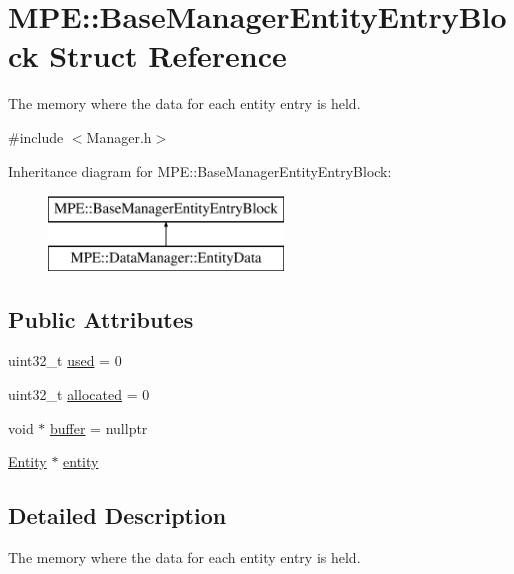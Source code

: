 \hypertarget{struct_m_p_e_1_1_base_manager_entity_entry_block}{}\section{M\+PE\+:\+:Base\+Manager\+Entity\+Entry\+Block Struct Reference}
\label{struct_m_p_e_1_1_base_manager_entity_entry_block}


The memory where the data for each entity entry is held.  




{\ttfamily \#include $<$Manager.\+h$>$}

Inheritance diagram for M\+PE\+:\+:Base\+Manager\+Entity\+Entry\+Block\+:\begin{figure}[H]
\begin{center}
\leavevmode
\includegraphics[height=2.000000cm]{struct_m_p_e_1_1_base_manager_entity_entry_block}
\end{center}
\end{figure}
\subsection*{Public Attributes}
\begin{DoxyCompactItemize}
\item 
uint32\+\_\+t \hyperlink{struct_m_p_e_1_1_base_manager_entity_entry_block_a9bb99ec160ea2058b700023dd7b05d78}{used} = 0
\item 
uint32\+\_\+t \hyperlink{struct_m_p_e_1_1_base_manager_entity_entry_block_a9a3b521d536a0650656c6ffd58868a56}{allocated} = 0
\item 
void $\ast$ \hyperlink{struct_m_p_e_1_1_base_manager_entity_entry_block_a474a83fa9930cbdcd6b4da102ae2b366}{buffer} = nullptr
\item 
\hyperlink{struct_m_p_e_1_1_entity}{Entity} $\ast$ \hyperlink{struct_m_p_e_1_1_base_manager_entity_entry_block_a6eddce97e38561fc4a22b5610ad3123c}{entity}
\end{DoxyCompactItemize}


\subsection{Detailed Description}
The memory where the data for each entity entry is held. 

